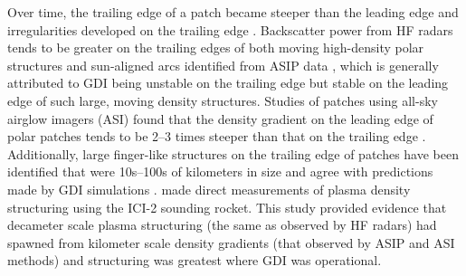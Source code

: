 Over time, the trailing edge of a patch became steeper than the leading edge and irregularities developed on the trailing edge \citep{Weber1984}.  Backscatter power from HF radars tends to be greater on the trailing edges of both moving high-density polar structures \citep{Milan2002b} and sun-aligned arcs identified from ASIP data \citep{Koustov2012}, which is generally attributed to GDI being unstable on the trailing edge but stable on the leading edge of such large, moving density structures.  Studies of patches using all-sky airglow imagers (ASI) found that the density gradient on the leading edge of polar patches tends to be 2--3 times steeper than that on the trailing edge \citep{Hosokawa2016}.  Additionally, large finger-like structures on the trailing edge of patches have been identified that were 10s--100s of kilometers in size and agree with predictions made by GDI simulations \citep{Gondarenko2004b}.  \citet{Moen2012} made direct measurements of plasma density structuring using the ICI-2 sounding rocket.  This study provided evidence that decameter scale plasma structuring (the same as observed by HF radars) had spawned from kilometer scale density gradients (that observed by ASIP and ASI methods) and structuring was greatest where GDI was operational.

